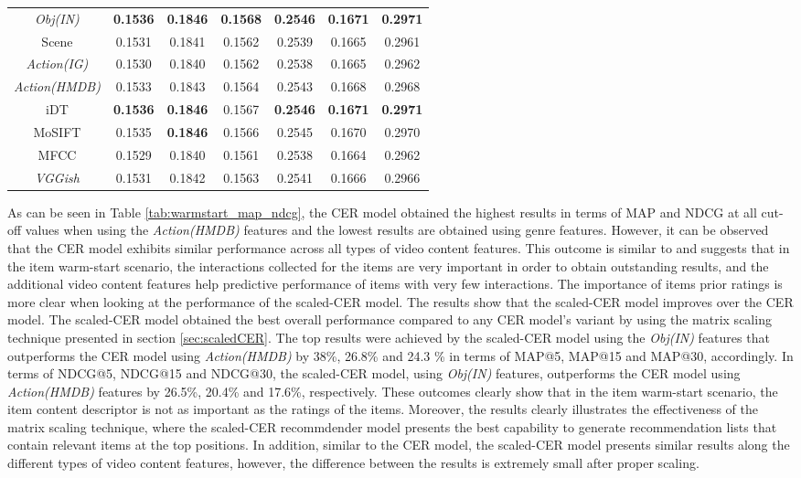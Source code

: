 \documentclass[review]{elsarticle}
\begin{document}
\begin{table}[H]
\begin{adjustbox}{width=\columnwidth}
\begin{tabular}{|c|c c c c c c|}
\textit{Obj(IN)} 	&\textbf{0.1536}	&\textbf{0.1846}	&\textbf{0.1568}	&\textbf{0.2546}	&\textbf{0.1671}	&\textbf{0.2971}	\\ 
Scene 	&0.1531	&0.1841	&0.1562	&0.2539	&0.1665	&0.2961	\\ 
\textit{Action(IG)} 	&0.1530	&0.1840	&0.1562	&0.2538	&0.1665	&0.2962	\\ 
\textit{Action(HMDB)} 	&0.1533	&0.1843	&0.1564	&0.2543	&0.1668	&0.2968	\\ 
iDT 	&\textbf{0.1536}	&\textbf{0.1846}	&0.1567	&\textbf{0.2546}	&\textbf{0.1671}	&\textbf{0.2971}	\\ 
MoSIFT	&0.1535	&\textbf{0.1846}	&0.1566	&0.2545	&0.1670	&0.2970	\\ 
MFCC 	&0.1529	&0.1840	&0.1561	&0.2538	&0.1664	&0.2962	\\ 
\textit{VGGish} 	&0.1531	&0.1842	&0.1563	&0.2541	&0.1666	&0.2966	\\  \hline
    \end{tabular}
    \end{adjustbox}
\end{table}

As can be seen in Table \ref{tab:warmstart_map_ndcg}, the CER model obtained the highest results in terms of MAP and NDCG at all cut-off values when using the \textit{Action(HMDB)} features and the lowest results are obtained using genre features. However, it can be observed that the CER model exhibits similar performance across all types of video content features. This outcome is similar to \citep{du2018personalized} and suggests that in the item warm-start scenario, the interactions collected for the items are very important in order to obtain outstanding results, and the additional video content features help predictive performance of items with very few interactions. The importance of items prior ratings is more clear when looking at the performance of the scaled-CER model. The results show that the scaled-CER model improves over the CER model. The scaled-CER model obtained the best overall performance compared to any CER model's variant by using the matrix scaling technique presented in section \ref{sec:scaledCER}. The top results were achieved by the scaled-CER model using the \textit{Obj(IN)} features that outperforms the CER model using \textit{Action(HMDB)} by 38\%, 26.8\% and 24.3 \% in terms of MAP@5, MAP@15 and MAP@30, accordingly. In terms of NDCG@5, NDCG@15 and NDCG@30, the scaled-CER model, using \textit{Obj(IN)} features, outperforms the CER model using \textit{Action(HMDB)} features by 26.5\%, 20.4\% and 17.6\%, respectively. These outcomes clearly show that in the item warm-start scenario, the item content descriptor is not as important as the ratings of the items. Moreover, the results clearly illustrates the effectiveness of the matrix scaling technique, where the scaled-CER recommdender model presents the best capability to generate recommendation lists that contain relevant items at the top positions. In addition, similar to the CER model, the scaled-CER model presents similar results along the different types of video content features, however, the difference between the results is extremely small after proper scaling. 
\end{document}
